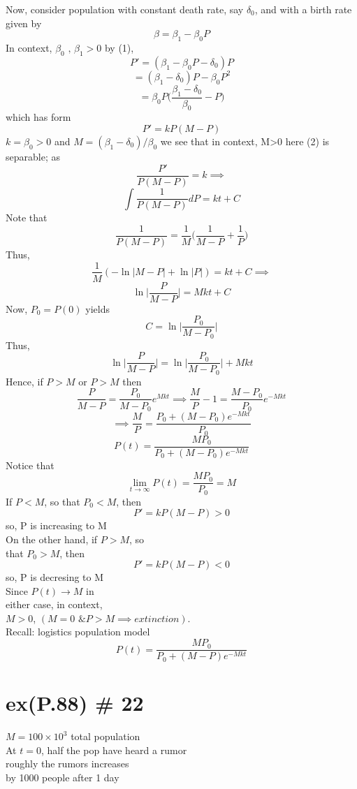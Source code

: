   Now, consider population with constant 
  death rate, say \( \delta_0 \), and with a birth 
  rate given by 
  \[ \beta = \beta_1 - \beta_0P \]
  In context, \( \beta_0 \text{ , } \beta_1 > 0 \) by (1),
  \[ P' = ( \beta_1 - \beta_0 P -\delta_0 ) P\] 
  \[  = ( \beta_1 - \delta_0 ) P - \beta_0 P^2 \]
  \[ = \beta_0 P \Big( \frac{ \beta_1-\delta_0}{\beta_0} -P \Big) \]
  which has form 
  \[ P' =  kP(M-P) \]
  \( k = \beta_0 > 0 \) and \( M = (\beta_1 -\delta_0)/ \beta_0  \) we
  see that in context, M>0 here (2) 
  is separable; as 
  \[ \frac{P'}{P(M-P)} =k \implies  \]
  \[ \int \frac{1}{P(M-P)}dP = kt + C \]
  Note that
  \[ \frac{1}{P(M-P)} = \frac{1}{M} \bigg( \frac{1}{M-P} +
  \frac{1}{P}\bigg) \]
  Thus, 
  \[ \frac{1}{M} (- \ln | M-P| + \ln|P|) = kt + C \implies  \]
  \[ \ln \bigg| \frac{P}{M-P} \bigg| = Mkt + C \]
  Now, \( P_0 = P(0) \) yields 
  \[ C = \ln \bigg| \frac{P_0}{M - P_0}\bigg|  \]
  Thus,
  \[ \ln \Big| \frac{P}{M-P} \bigg| = \ln \bigg| \frac{P_0}{M - P_0}\Big| + Mkt\]
  Hence, if \( P > M \) or \( P > M \) then  
  \[  \frac{P}{M-P} = \frac{P_0}{M - P_0} e^{Mkt} \implies \frac{M}{P}
  -1 =  \frac{M - P_0}{P_0} e^{-Mkt}\]
  \[ \implies  \frac{M}{P} = \frac{P_0 + (M-P_0)e^{-Mkt}}{P_0} \]
  \[ \boxed{P(t) = \frac{MP_0}{P_0 + (M-P_0)e^{-Mkt}} } \]
  Notice that
  \[ \lim_{t \to \infty} P(t) = \frac{MP_0}{P_0} = M \]
  If \( P<M \), so that \( P_0 < M \), then
  \[ P' = kP(M-P) > 0 \]
  so, P is increasing to M \\[5mm]
  On the other hand, if \( P > M \), so \\
  that \( P_0>M \), then 
  \[ P' = kP(M-P) <0 \]
  so, P is decresing to M \\
  Since \( P(t) \to M \) in \\
  either case, in context,  \\
  \( M>0 \), \(  ( M = 0 \text{ \& } P>M \implies extinction) \). \\

  \newpage  
  Recall: logistics population model 
  \[ P(t) = \frac{MP_0}{P_0 + (M - P)e^{-Mkt}} \]

\section{ex(P.88) \# 22}
  \(M=100 \times 10^3 \) total population \\
  At \( t=0 \), half the pop have heard a rumor \\
  roughly the rumors increases \\
  by 1000 people after 1 day \\ 

